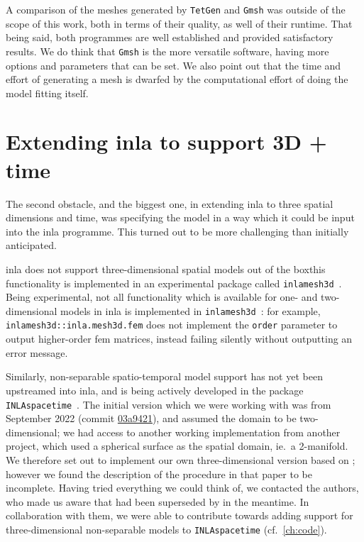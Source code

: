 \documentclass[british]{scrreprt}
\begin{document}
A comparison of the meshes generated by \texttt{TetGen} and \texttt{Gmsh} was outside of the scope of this work, both in terms of their quality, as well of their runtime. That being said, both programmes are well established and provided satisfactory results.
We do think that \texttt{Gmsh} is the more versatile software, having more options and parameters that can be set. We also point out that the time and effort of generating a mesh is dwarfed by the computational effort of doing the model fitting itself.

\section{Extending \texorpdfstring{\acrshort{inla}}{INLA} to support 3D + time}
\label{sec:extending}

The second obstacle, and the biggest one, in extending \gls{inla} to three spatial dimensions and time, was specifying the model in a way which it could be input into the \gls{inla} programme. This turned out to be more challenging than initially anticipated.

\gls{inla} does not support three-dimensional spatial models out of the box\textemdash{}this functionality is implemented in an experimental package called \texttt{inlamesh3d}~\cite{Lindgreninlamesh3d2022}. Being experimental, not all functionality which is available for one- and two-dimensional models in \gls{inla} is implemented in \texttt{inlamesh3d}~\cite{Lindgreninlamesh3d2022}: for example, \texttt{inlamesh3d::inla.mesh3d.fem} does not implement the \texttt{order} parameter to output higher-order \gls{fem} matrices, instead failing silently without outputting an error message.

Similarly, non-separable spatio-temporal model support has not yet been upstreamed into \gls{inla}, and is being actively developed in the package \texttt{INLAspacetime}~\cite{KrainskiINLAspacetime2022}. The initial version which we were working with was from September 2022 (commit \href{https://github.com/eliaskrainski/INLAspacetime/tree/03a9421fb9afcd9dd0d3e969452a4a4cf0a98200}{03a9421}), and assumed the domain to be two-dimensional; we had access to another working implementation from another project, which used a spherical surface as the spatial domain, ie.\ a 2-manifold.  We therefore set out to implement our own three-dimensional version based on \cite{BakkadiffusionbasedextensionMatern2020}; however we found the description of the procedure in that paper to be incomplete. Having tried everything we could think of, we contacted the authors, who made us aware that \cite{BakkadiffusionbasedextensionMatern2020} had been superseded by \cite{Lindgrendiffusionbasedspatiotemporalextension2022} in the meantime. In collaboration with them, we were able to contribute towards adding support for three-dimensional non-separable models to \texttt{INLAspacetime} (cf.\ \cref{ch:code}).
\end{document}
